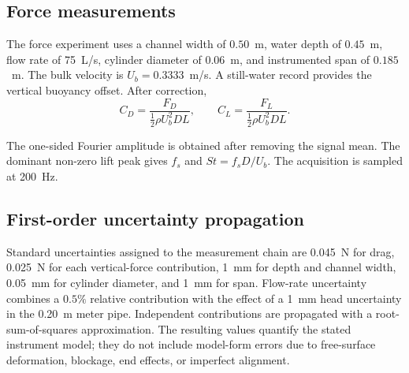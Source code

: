 \subsection{Force measurements}

The force experiment uses a channel width of $0.50$~m, water depth of $0.45$~m, flow rate of 75~L/s, cylinder diameter of $0.06$~m, and instrumented span of $0.185$~m. The bulk velocity is $U_b=0.3333$~m/s. A still-water record provides the vertical buoyancy offset. After correction,
\begin{equation}
C_D=\frac{F_D}{\tfrac12\rho U_b^2DL}, \qquad
C_L=\frac{F_L}{\tfrac12\rho U_b^2DL}.
\end{equation}

The one-sided Fourier amplitude is obtained after removing the signal mean. The dominant non-zero lift peak gives $f_s$ and $St=f_sD/U_b$. The acquisition is sampled at 200~Hz.

\subsection{First-order uncertainty propagation}

Standard uncertainties assigned to the measurement chain are 0.045~N for drag, 0.025~N for each vertical-force contribution, 1~mm for depth and channel width, 0.05~mm for cylinder diameter, and 1~mm for span. Flow-rate uncertainty combines a $0.5\%$ relative contribution with the effect of a 1~mm head uncertainty in the 0.20~m meter pipe. Independent contributions are propagated with a root-sum-of-squares approximation. The resulting values quantify the stated instrument model; they do not include model-form errors due to free-surface deformation, blockage, end effects, or imperfect alignment.
